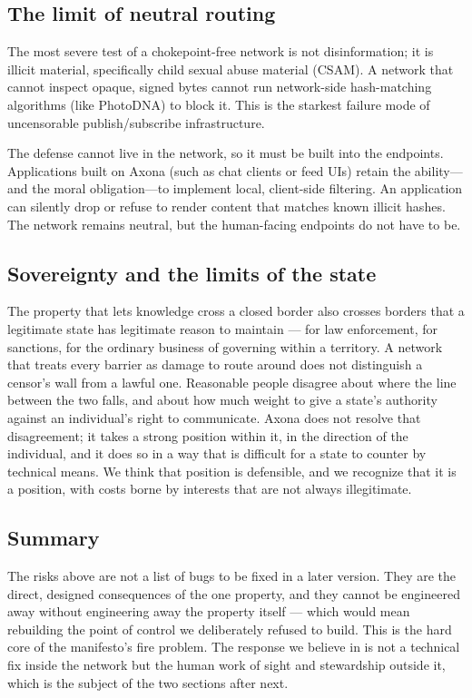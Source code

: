 \documentclass[nobib,justified]{tufte-handout}
\begin{document}
\subsection{The limit of neutral routing}

The most severe test of a chokepoint-free network is not disinformation; it is
illicit material, specifically child sexual abuse material (CSAM). A network that
cannot inspect opaque, signed bytes cannot run network-side hash-matching
algorithms (like PhotoDNA) to block it. This is the starkest failure mode of
uncensorable publish/subscribe infrastructure.

The defense cannot live in the network, so it must be built into the endpoints.
Applications built on Axona (such as chat clients or feed UIs) retain the
ability---and the moral obligation---to implement local, client-side filtering.
An application can silently drop or refuse to render content that matches known
illicit hashes. The network remains neutral, but the human-facing endpoints do
not have to be.

\subsection{Sovereignty and the limits of the state}

The property that lets knowledge cross a closed border also crosses borders that
a legitimate state has legitimate reason to maintain --- for law enforcement, for
sanctions, for the ordinary business of governing within a territory. A network
that treats every barrier as damage to route around does not distinguish a
censor's wall from a lawful one. Reasonable people disagree about where the line
between the two falls, and about how much weight to give a state's authority
against an individual's right to communicate. Axona does not resolve that
disagreement; it takes a strong position within it, in the direction of the
individual, and it does so in a way that is difficult for a state to counter by
technical means. We think that position is defensible, and we recognize that it
is a position, with costs borne by interests that are not always illegitimate.

\subsection{Summary}

The risks above are not a list of bugs to be fixed in a later version. They are
the direct, designed consequences of the one property, and they cannot be
engineered away without engineering away the property itself --- which would mean
rebuilding the point of control we deliberately refused to build. This is the
hard core of the manifesto's fire problem. The response we believe in is not a
technical fix inside the network but the human work of sight and stewardship
outside it, which is the subject of the two sections after next.
\end{document}
